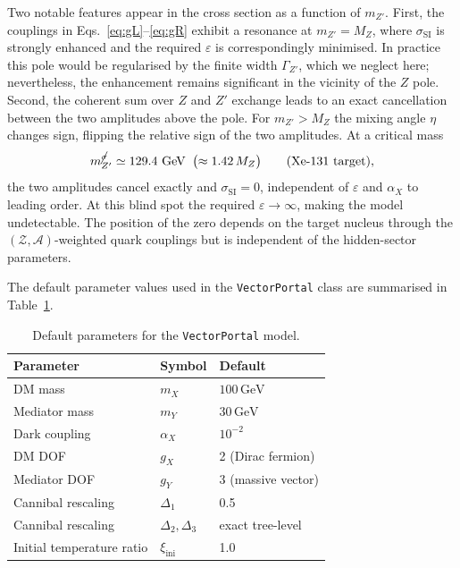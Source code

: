 \documentclass[11pt]{article}
\numberwithin{equation}{section}
\newcommand{\GeV}{\,\text{GeV}}
\newcommand{\mX}{m_X}
\newcommand{\mY}{m_Y}
\newcommand{\alphaX}{\alpha_X}
\newcommand{\epsX}{\varepsilon}
\begin{document}
Two notable features appear in the cross section as a function of $m_{Z'}$. First, the couplings in Eqs.~\eqref{eq:gL}--\eqref{eq:gR} exhibit a resonance at $m_{Z'} = M_Z$, where $\sigma_{\text{SI}}$ is strongly enhanced and the required $\epsX$ is correspondingly minimised. In practice this pole would be regularised by the finite width $\Gamma_{Z'}$, which we neglect here; nevertheless, the enhancement remains significant in the vicinity of the $Z$ pole. Second, the coherent sum over $Z$ and $Z'$ exchange leads to an exact cancellation between the two amplitudes above the pole. For $m_{Z'} > M_Z$ the mixing angle $\eta$ changes sign, flipping the relative sign of the two amplitudes. At a critical mass
\begin{equation}
    m_{Z'}^{\cancel{\sigma}} \simeq 129.4~\text{GeV}
    \;\;\bigl(\approx 1.42\,M_Z\bigr)
    \qquad\text{(Xe-131 target)},
    \label{eq:VP_blind_spot}
\end{equation}
the two amplitudes cancel exactly and $\sigma_{\text{SI}} = 0$, independent of $\epsX$ and $\alphaX$ to leading order. At this blind spot the required $\epsX \to \infty$, making the model undetectable. The position of the zero depends on the target nucleus through the $(\mathcal{Z}, \mathcal{A})$-weighted quark couplings but is independent of the hidden-sector parameters.

The default parameter values used in the \texttt{VectorPortal} class are summarised in Table~\ref{tab:VP_defaults}.
\begin{table}[h]
\centering
\begin{tabular}{lll}
\toprule
Parameter & Symbol & Default \\
\midrule
DM mass & $\mX$ & $100\GeV$ \\
Mediator mass & $\mY$ & $30\GeV$ \\
Dark coupling & $\alphaX$ & $10^{-2}$ \\
DM DOF & $g_X$ & 2 (Dirac fermion) \\
Mediator DOF & $g_Y$ & 3 (massive vector) \\
Cannibal rescaling & $\Delta_1$ & 0.5 \\
Cannibal rescaling & $\Delta_2, \Delta_3$ & exact tree-level \\
Initial temperature ratio & $\xi_{\text{ini}}$ & 1.0 \\
\bottomrule
\end{tabular}
\caption{Default parameters for the \texttt{VectorPortal} model.}
\label{tab:VP_defaults}
\end{table}
\end{document}
